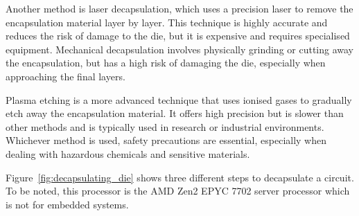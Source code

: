 Another method is laser decapsulation, which uses a precision laser to remove the encapsulation material layer by layer. This technique is highly accurate and reduces the risk of damage to the die, but it is expensive and requires specialised equipment. Mechanical decapsulation involves physically grinding or cutting away the encapsulation, but has a high risk of damaging the die, especially when approaching the final layers.

Plasma etching is a more advanced technique that uses ionised gases to gradually etch away the encapsulation material. It offers high precision but is slower than other methods and is typically used in research or industrial environments. Whichever method is used, safety precautions are essential, especially when dealing with hazardous chemicals and sensitive materials.

Figure~\ref{fig:decapsulating_die} shows three different steps to decapsulate a circuit. To be noted, this processor is the AMD Zen2 EPYC 7702 server processor which is not for embedded systems.

